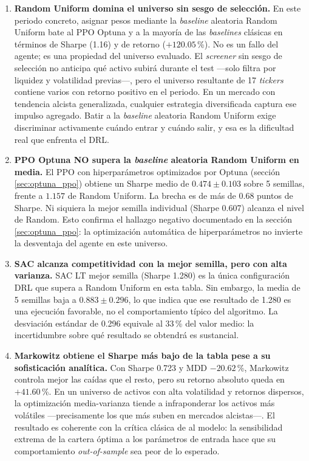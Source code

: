 \documentclass[IB,a4paper]{TFUOC}
\begin{document}
\begin{enumerate}
    \item \textbf{Random Uniform domina el universo sin sesgo de selección.} En este periodo concreto, asignar pesos mediante la \textit{baseline} aleatoria Random Uniform bate al PPO Optuna y a la mayoría de las \textit{baselines} clásicas en términos de Sharpe (1.16) y de retorno ($+120.05$\,\%). No es un fallo del agente; es una propiedad del universo evaluado. El \textit{screener} sin sesgo de selección no anticipa qué activo subirá durante el test —solo filtra por liquidez y volatilidad previas—, pero el universo resultante de 17 \textit{tickers} contiene varios con retorno positivo en el periodo. En un mercado con tendencia alcista generalizada, cualquier estrategia diversificada captura ese impulso agregado. Batir a la \textit{baseline} aleatoria Random Uniform exige discriminar activamente cuándo entrar y cuándo salir, y esa es la dificultad real que enfrenta el DRL.

    \item \textbf{PPO Optuna NO supera la \textit{baseline} aleatoria Random Uniform en media.} El PPO con hiperparámetros optimizados por Optuna (sección \ref{sec:optuna_ppo}) obtiene un Sharpe medio de $0.474 \pm 0.103$ sobre 5 semillas, frente a $1.157$ de Random Uniform. La brecha es de más de 0.68 puntos de Sharpe. Ni siquiera la mejor semilla individual (Sharpe 0.607) alcanza el nivel de Random. Esto confirma el hallazgo negativo documentado en la sección \ref{sec:optuna_ppo}: la optimización automática de hiperparámetros no invierte la desventaja del agente en este universo.

    \item \textbf{SAC alcanza competitividad con la mejor semilla, pero con alta varianza.} SAC LT mejor semilla (Sharpe 1.280) es la única configuración DRL que supera a Random Uniform en esta tabla. Sin embargo, la media de 5 semillas baja a $0.883 \pm 0.296$, lo que indica que ese resultado de 1.280 es una ejecución favorable, no el comportamiento típico del algoritmo. La desviación estándar de 0.296 equivale al 33\,\% del valor medio: la incertidumbre sobre qué resultado se obtendrá es sustancial.

    \item \textbf{Markowitz obtiene el Sharpe más bajo de la tabla pese a su sofisticación analítica.} Con Sharpe 0.723 y MDD $-20.62$\,\%, Markowitz controla mejor las caídas que el resto, pero su retorno absoluto queda en $+41.60$\,\%. En un universo de activos con alta volatilidad y retornos dispersos, la optimización media-varianza tiende a infraponderar los activos más volátiles —precisamente los que más suben en mercados alcistas—. El resultado es coherente con la crítica clásica de \citet{michaud1989} al modelo: la sensibilidad extrema de la cartera óptima a los parámetros de entrada hace que su comportamiento \textit{out-of-sample} sea peor de lo esperado.
\end{enumerate}
\end{document}

